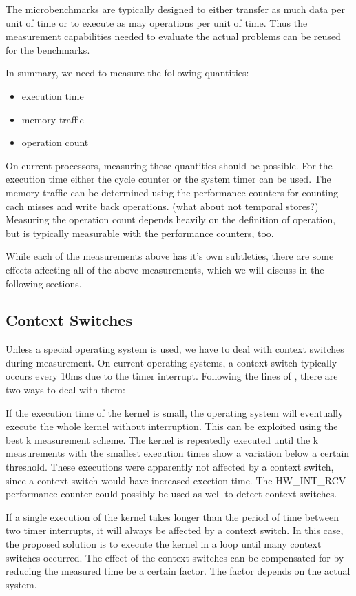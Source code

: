 \documentclass[12pt]{article}
\begin{document}
The microbenchmarks are typically designed to either transfer as much data per unit of time or to execute as may operations per unit of time. Thus the measurement capabilities needed to evaluate the actual problems can be reused for the benchmarks. 

In summary, we need to measure the following quantities:
\begin{itemize}
\item execution time
\item memory traffic
\item operation count
\end{itemize}

On current processors, measuring these quantities should be possible. For the execution time either the cycle counter or the system timer can be used. The memory traffic can be determined using the performance counters for counting cach misses and write back operations. (what about not temporal stores?) Measuring the operation count depends heavily on the definition of operation, but is typically measurable with the performance counters, too.

While each of the measurements above has it's own subtleties, there are some effects affecting all of the above measurements, which we will discuss in the following sections.

\subsection{Context Switches}

Unless a special operating system is used, we have to deal with context switches during measurement. On current operating systems, a context switch typically occurs every 10ms due to the timer interrupt. Following the lines of \cite{ComSysProgPersp}, there are two ways to deal with them:

If the execution time of the kernel is small, the operating system will eventually execute the whole kernel without interruption. This can be exploited using the best k measurement scheme. The kernel is repeatedly executed until the k measurements with the smallest execution times show a variation below a certain threshold. These executions were apparently not affected by a context switch, since a context switch would have increased exection time. The HW\_INT\_RCV performance counter could possibly be used as well to detect context switches.

If a single execution of the kernel takes longer than the period of time between two timer interrupts, it will always be affected by a context switch. In this case, the proposed solution is to execute the kernel in a loop until many context switches occurred. The effect of the context switches can be compensated for by reducing the measured time be a certain factor. The factor depends on the actual system.
\end{document}

